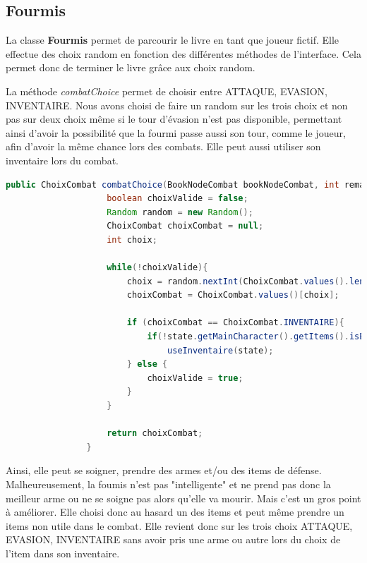 		\subsection{Fourmis}\label{sub:fourmis}
			La classe \textbf{Fourmis} permet de parcourir le livre en tant que joueur fictif. Elle effectue des choix random en fonction des différentes méthodes de l'interface. Cela permet donc de terminer le livre grâce aux choix random.

			La méthode \textit{combatChoice} permet de choisir entre ATTAQUE, EVASION, INVENTAIRE. Nous avons choisi de faire un random sur les trois choix et non pas sur deux choix même si le tour d'évasion n'est pas disponible, permettant ainsi d'avoir la possibilité que la fourmi passe aussi son tour, comme le joueur, afin d'avoir la même chance lors des combats. Elle peut aussi utiliser son inventaire lors du combat.

			\begin{lstlisting}[gobble=16, language=java, caption=combatChoice() de Fourmis]
				public ChoixCombat combatChoice(BookNodeCombat bookNodeCombat, int remainingRoundBeforeEvasion, BookState state) {
					boolean choixValide = false;
					Random random = new Random();
					ChoixCombat choixCombat = null;
					int choix;

					while(!choixValide){
						choix = random.nextInt(ChoixCombat.values().length);
						choixCombat = ChoixCombat.values()[choix];

						if (choixCombat == ChoixCombat.INVENTAIRE){
							if(!state.getMainCharacter().getItems().isEmpty())
								useInventaire(state);
						} else {
							choixValide = true;
						}
					}

					return choixCombat;
				}
			\end{lstlisting}

			 Ainsi, elle peut se soigner, prendre des armes et/ou des items de défense. Malheureusement, la foumis n'est pas "intelligente" et ne prend pas donc la meilleur arme ou ne se soigne pas alors qu'elle va mourir. Mais c'est un gros point à améliorer. Elle choisi donc au hasard un des items et peut même prendre un items non utile dans le combat. Elle revient donc sur les trois choix ATTAQUE, EVASION, INVENTAIRE sans avoir pris une arme ou autre lors du choix de l'item dans son inventaire.

